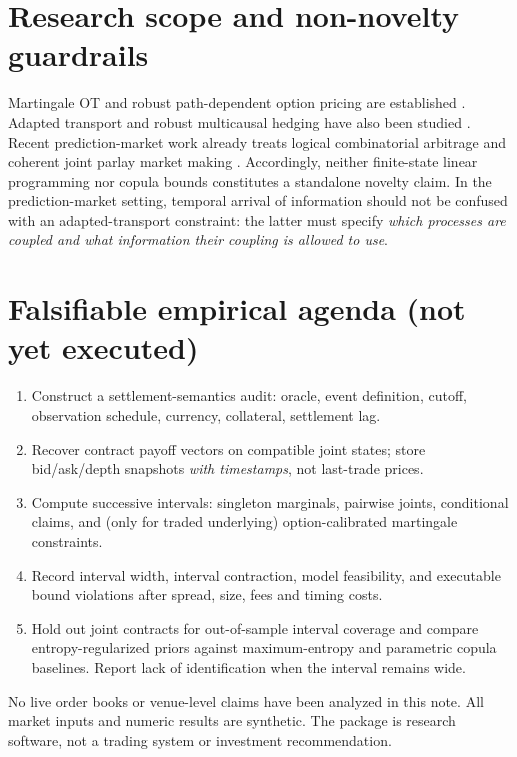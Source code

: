 \documentclass[11pt]{article}
\begin{document}
\section{Research scope and non-novelty guardrails}
Martingale OT and robust path-dependent option pricing are established
\citep{beiglbock2013model,guo2021path,engstrom2025computation}.
Adapted transport and robust multicausal hedging have also been studied
\citep{krsek2025general}. Recent prediction-market work already treats
logical combinatorial arbitrage \citep{shi2026combinatorial} and coherent
joint parlay market making \citep{rana2026parlay}. Accordingly, neither
finite-state linear programming nor copula bounds constitutes a standalone
novelty claim. In the prediction-market setting, temporal arrival of
information should not be confused with an adapted-transport constraint:
the latter must specify \emph{which processes are coupled and what
information their coupling is allowed to use}.

\section{Falsifiable empirical agenda (not yet executed)}
\begin{enumerate}
\item Construct a settlement-semantics audit: oracle, event definition,
cutoff, observation schedule, currency, collateral, settlement lag.
\item Recover contract payoff vectors on compatible joint states; store
bid/ask/depth snapshots \emph{with timestamps}, not last-trade prices.
\item Compute successive intervals: singleton marginals, pairwise joints,
conditional claims, and (only for traded underlying) option-calibrated
martingale constraints.
\item Record interval width, interval contraction, model feasibility,
and executable bound violations after spread, size, fees and timing costs.
\item Hold out joint contracts for out-of-sample interval coverage and
compare entropy-regularized priors against maximum-entropy and parametric
copula baselines. Report lack of identification when the interval remains wide.
\end{enumerate}
No live order books or venue-level claims have been analyzed in this note.
All market inputs and numeric results are synthetic. The package is
research software, not a trading system or investment recommendation.
\end{document}
